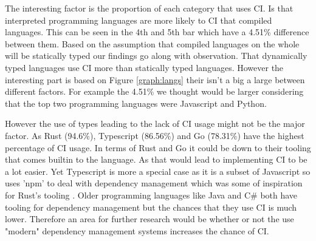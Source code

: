 \documentclass[twoside,12pt,titlepage,a4paper]{article}
\begin{document}
The interesting factor is the proportion of each category that uses CI. Is that interpreted programming languages are more likely to CI that compiled languages. This can be seen in the 4th and 5th bar which have a 4.51\% difference between them. Based on the assumption that compiled languages on the whole will be statically typed our findings go along with \citet{Hilton2016} observation. That dynamically typed languages use CI more than statically typed languages. However the interesting part is based on Figure \ref{graph:langs} their isn't a big a large between different factors. For example the 4.51\% we thought would be larger considering that the top two programming languages were Javascript and Python. 

However the use of types leading to the lack of CI usage might not be the major factor. As Rust (94.6\%), Typescript (86.56\%) and Go (78.31\%) have the highest percentage of CI usage. In terms of Rust and Go it could be down to their tooling that comes builtin to the language. As that would lead to implementing CI to be a lot easier. Yet Typescript is more a special case as it is a subset of Javascript so uses 'npm' to deal with dependency management which was some of inspiration for Rust's tooling \citet{RustBlogCargo}.  Older programming languages like Java and C\# both have tooling for dependency management but the chances that they use CI is much lower. Therefore an area for further research would be whether or not the use "modern" dependency management systems increases the chance of CI.


\end{document}
